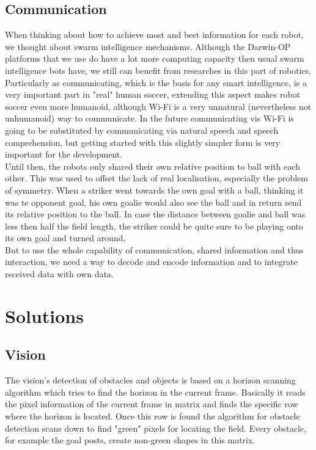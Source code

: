 \documentclass[lnicst,a4paper]{svmultln}
\begin{document}
\subsection{Communication}
\label{sec:problems_communication}
When thinking about how to achieve most and best information for each robot, we thought about swarm intelligence mechanisms. Although the Darwin-OP platforms that we use do have a lot more computing capacity then usual swarm intelligence bots have, we still can benefit from researches in this part of robotics. 
\\
Particularly as communicating, which is the basis for any smart intelligence, is a very important part in "real" human soccer, extending this aspect makes robot soccer even more humanoid, although Wi-Fi is a very unnatural (nevertheless not unhumanoid) way to communicate. In the future communicating vis Wi-Fi is going to be substituted by communicating via natural speech and speech comprehension, but getting started with this slightly simpler form is very important for the development.
\\
Until then, the robots only shared their own relative position to ball with each other. This was used to offset the lack of real localisation, especially the problem of symmetry. When a striker went towards the own goal with a ball, thinking it was te opponent goal, his own goalie would also see the ball and in return send its relative position to the ball. In case the distance between goalie and ball was less then half the field length, the striker could be quite sure to be playing onto its own goal and turned around. 
\\
But to use the whole capability of communication, shared information and thus interaction, we need a way to decode and encode information and to integrate received data with own data.





\section{Solutions}






\subsection{Vision}
\label{sec:solutions_vision}
The vision's detection of obstacles and objects is based on a horizon scanning algorithm which tries to find the horizon in the current frame. Basically it reads the pixel information of the current frame in matrix and finds the specific row where the horizon is located.
Once this row is found the algorithm for obstacle detection scans down to find "green" pixels for locating the field. Every obstacle, for example the goal posts, create non-green shapes in this matrix.
\end{document}
